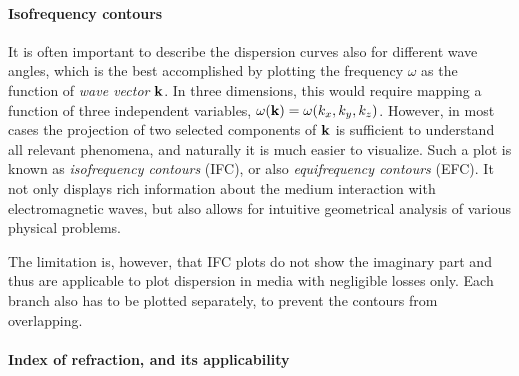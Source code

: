 \paragraph{Isofrequency contours}  %
It is often important to describe the dispersion curves also for different wave angles, which is the best accomplished by plotting the  %
frequency $\omega$ as the function of \textit{wave vector} ${\mathbf{k}}$. In three dimensions, this would require mapping a function of three independent variables, $\omega({\mathbf{k}}) = \omega(k_x, k_y, k_z)$. However, in most cases the projection of two selected components of ${\mathbf{k}}$ is sufficient to understand all relevant phenomena, and naturally it is much easier to visualize.
Such a plot is known as \textit{isofrequency contours} (IFC), or also \textit{equifrequency contours} (EFC). It not only displays rich %
information about the medium interaction with electromagnetic waves, but also allows for intuitive geometrical analysis of various physical problems. 

The limitation is, however, that IFC plots do not show the imaginary part and thus are applicable to plot dispersion in media with negligible losses only.  %
Each branch also has to be plotted separately, to prevent the contours from overlapping.

\paragraph{Index of refraction, and its applicability}  %


